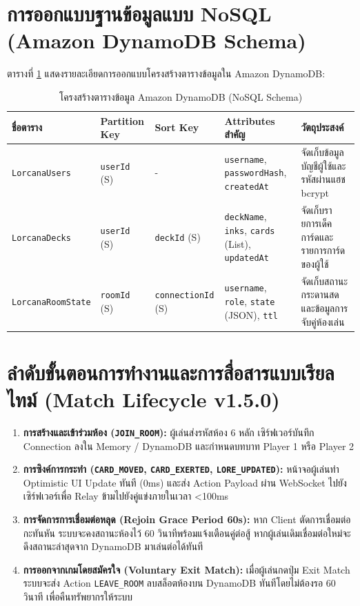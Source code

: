 \documentclass[12pt,a4paper]{report}
\begin{document}
\section{การออกแบบฐานข้อมูลแบบ NoSQL (Amazon DynamoDB Schema)}
ตารางที่ \ref{tab:dynamodb_schema} แสดงรายละเอียดการออกแบบโครงสร้างตารางข้อมูลใน Amazon DynamoDB:

\begin{table}[H]
\centering
\caption{โครงสร้างตารางข้อมูล Amazon DynamoDB (NoSQL Schema)}
\label{tab:dynamodb_schema}
\small
\begin{tabularx}{\textwidth}{lp{2.2cm}p{2.2cm}>{\raggedright\arraybackslash}X>{\raggedright\arraybackslash}p{3.5cm}}
\toprule
\textbf{ชื่อตาราง} & \textbf{Partition Key} & \textbf{Sort Key} & \textbf{Attributes สำคัญ} & \textbf{วัตถุประสงค์} \\
\midrule
\texttt{LorcanaUsers} & \texttt{userId} (S) & - & \texttt{username}, \texttt{passwordHash}, \texttt{createdAt} & จัดเก็บข้อมูลบัญชีผู้ใช้และรหัสผ่านแฮช bcrypt \\
\texttt{LorcanaDecks} & \texttt{userId} (S) & \texttt{deckId} (S) & \texttt{deckName}, \texttt{inks}, \texttt{cards} (List), \texttt{updatedAt} & จัดเก็บรายการเด็คการ์ดและรายการการ์ดของผู้ใช้ \\
\texttt{LorcanaRoomState} & \texttt{roomId} (S) & \texttt{connectionId} (S) & \texttt{username}, \texttt{role}, \texttt{state} (JSON), \texttt{ttl} & จัดเก็บสถานะกระดานสดและข้อมูลการจับคู่ห้องเล่น \\
\bottomrule
\end{tabularx}
\end{table}

\section{ลำดับขั้นตอนการทำงานและการสื่อสารแบบเรียลไทม์ (Match Lifecycle v1.5.0)}
\begin{enumerate}
    \item \textbf{การสร้างและเข้าร่วมห้อง (\texttt{JOIN\_ROOM}):} ผู้เล่นส่งรหัสห้อง 6 หลัก เซิร์ฟเวอร์บันทึก Connection ลงใน Memory / DynamoDB และกำหนดบทบาท Player 1 หรือ Player 2
    \item \textbf{การซิงค์การกระทำ (\texttt{CARD\_MOVED}, \texttt{CARD\_EXERTED}, \texttt{LORE\_UPDATED}):} หน้าจอผู้เล่นทำ Optimistic UI Update ทันที (0ms) และส่ง Action Payload ผ่าน WebSocket ไปยังเซิร์ฟเวอร์เพื่อ Relay ข้ามไปยังคู่แข่งภายในเวลา <100ms
    \item \textbf{การจัดการการเชื่อมต่อหลุด (Rejoin Grace Period 60s):} หาก Client ตัดการเชื่อมต่อกะทันหัน ระบบจะคงสถานะห้องไว้ 60 วินาทีพร้อมแจ้งเตือนคู่ต่อสู้ หากผู้เล่นเดิมเชื่อมต่อใหม่จะดึงสถานะล่าสุดจาก DynamoDB มาเล่นต่อได้ทันที
    \item \textbf{การออกจากเกมโดยสมัครใจ (Voluntary Exit Match):} เมื่อผู้เล่นกดปุ่ม Exit Match ระบบจะส่ง Action \texttt{LEAVE\_ROOM} ลบสล็อตห้องบน DynamoDB ทันทีโดยไม่ต้องรอ 60 วินาที เพื่อคืนทรัพยากรให้ระบบ
\end{enumerate}
\end{document}

